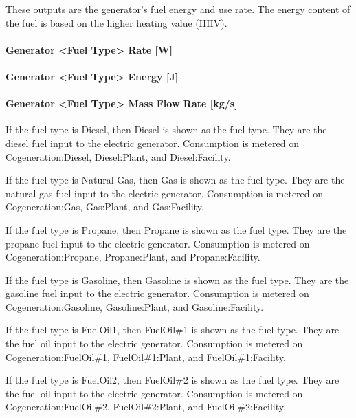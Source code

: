 These outputs are the generator's fuel energy and use rate. The energy content of the fuel is based on the higher heating value (HHV).

\paragraph{Generator \textless{}Fuel Type\textgreater{} Rate {[}W{]}}\label{generator-fuel-type-rate-w}

\paragraph{Generator \textless{}Fuel Type\textgreater{} Energy {[}J{]}}\label{generator-fuel-type-energy-j}

\paragraph{Generator \textless{}Fuel Type\textgreater{} Mass Flow Rate {[}kg/s{]}}\label{generator-fuel-type-mass-flow-rate-kgs}

If the fuel type is Diesel, then Diesel is shown as the fuel type. They are the diesel fuel input to the electric generator. Consumption is metered on Cogeneration:Diesel, Diesel:Plant, and Diesel:Facility.

If the fuel type is Natural Gas, then Gas is shown as the fuel type. They are the natural gas fuel input to the electric generator. Consumption is metered on Cogeneration:Gas, Gas:Plant, and Gas:Facility.

If the fuel type is Propane, then Propane is shown as the fuel type. They are the propane fuel input to the electric generator. Consumption is metered on Cogeneration:Propane, Propane:Plant, and Propane:Facility.

If the fuel type is Gasoline, then Gasoline is shown as the fuel type. They are the gasoline fuel input to the electric generator. Consumption is metered on Cogeneration:Gasoline, Gasoline:Plant, and Gasoline:Facility.

If the fuel type is FuelOil1, then FuelOil\#1 is shown as the fuel type. They are the fuel oil input to the electric generator. Consumption is metered on Cogeneration:FuelOil\#1, FuelOil\#1:Plant, and FuelOil\#1:Facility.

If the fuel type is FuelOil2, then FuelOil\#2 is shown as the fuel type. They are the fuel oil input to the electric generator. Consumption is metered on Cogeneration:FuelOil\#2, FuelOil\#2:Plant, and FuelOil\#2:Facility.

